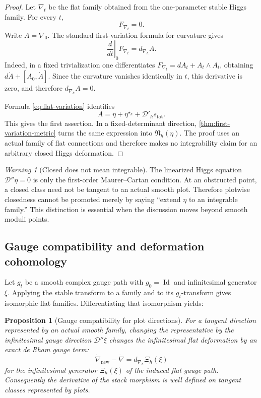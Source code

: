 \documentclass[11pt,reqno]{amsart}
\newtheorem{proposition}[theorem]{Proposition}
\theoremstyle{definition}
\theoremstyle{remark}
\newtheorem{warning}[theorem]{Warning}
\newcommand{\cD}{\mathcal D}
\newcommand{\Id}{\operatorname{Id}}
\begin{document}
\begin{proof}
Let $\nabla_t$ be the flat family obtained from the one-parameter stable Higgs family.  For every $t$,
\[
  F_{\nabla_t}=0.
\]
Write $A=\dot\nabla_0$.  The standard first-variation formula for curvature gives
\[
  \left.\frac{d}{dt}\right|_0F_{\nabla_t}
  =d_{\nabla_h}A.
\]
Indeed, in a fixed trivialization one differentiates $F_{\nabla_t}=dA_t+A_t\wedge A_t$, obtaining $d\dot A+[A_0,\dot A]$.  Since the curvature vanishes identically in $t$, this derivative is zero, and therefore $d_{\nabla_h}A=0$.

Formula \eqref{eq:flat-variation} identifies
\[
  A=\eta+\eta^{\star_h}+\cD'_hs_{\mathrm{tot}}.
\]
This gives the first assertion.  In a fixed-determinant direction, \cref{thm:first-variation-metric} turns the same expression into $\mathfrak N_h(\eta)$.  The proof uses an actual family of flat connections and therefore makes no integrability claim for an arbitrary closed Higgs deformation.
\end{proof}

\begin{warning}[Closed does not mean integrable]
The linearized Higgs equation $\cD''\eta=0$ is only the first-order Maurer--Cartan condition.  At an obstructed point, a closed class need not be tangent to an actual smooth plot.  Therefore plotwise closedness cannot be promoted merely by saying ``extend $\eta$ to an integrable family.''  This distinction is essential when the discussion moves beyond smooth moduli points.
\end{warning}

\subsection{Gauge compatibility and deformation cohomology}

Let $g_t$ be a smooth complex gauge path with $g_0=\Id$ and infinitesimal generator $\xi$.  Applying the stable transform to a family and to its $g_t$-transform gives isomorphic flat families.  Differentiating that isomorphism yields:

\begin{proposition}[Gauge compatibility for plot directions]\label{prop:gauge-compatibility}
For a tangent direction represented by an actual smooth family, changing the representative by the infinitesimal gauge direction $\cD''\xi$ changes the infinitesimal flat deformation by an exact de Rham gauge term:
\begin{equation}\label{eq:gauge-compatibility}
  \dot\nabla_{\mathrm{new}}-\dot\nabla
  =d_{\nabla_h}\Xi_h(\xi)
\end{equation}
for the infinitesimal generator $\Xi_h(\xi)$ of the induced flat gauge path.  Consequently the derivative of the stack morphism is well defined on tangent classes represented by plots.
\end{proposition}
\end{document}
